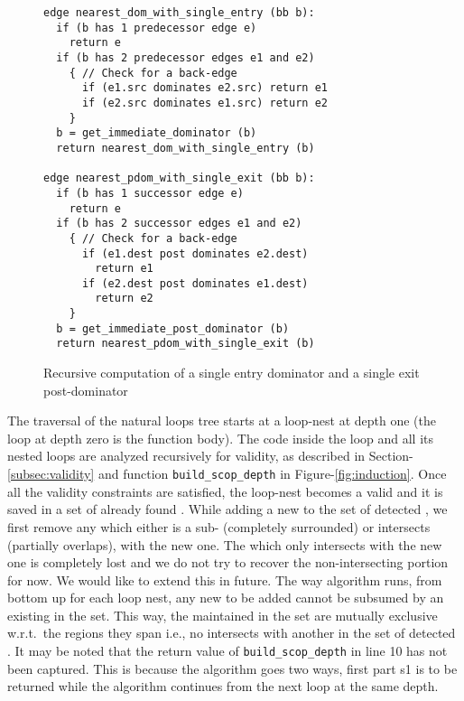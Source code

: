 \documentclass{sig-alternate}
\begin{document}
\begin{figure}
\begin{verbatim}
edge nearest_dom_with_single_entry (bb b):
  if (b has 1 predecessor edge e)
    return e
  if (b has 2 predecessor edges e1 and e2)
    { // Check for a back-edge
      if (e1.src dominates e2.src) return e1
      if (e2.src dominates e1.src) return e2
    }
  b = get_immediate_dominator (b)
  return nearest_dom_with_single_entry (b)

edge nearest_pdom_with_single_exit (bb b):
  if (b has 1 successor edge e)
    return e
  if (b has 2 successor edges e1 and e2)
    { // Check for a back-edge
      if (e1.dest post dominates e2.dest)
        return e1
      if (e2.dest post dominates e1.dest)
        return e2
    }
  b = get_immediate_post_dominator (b)
  return nearest_pdom_with_single_exit (b)
\end{verbatim}
\caption{Recursive computation of a single entry dominator and a single exit
  post-dominator}
\label{fig:iterate-single-entry}
\end{figure}

The traversal of the natural loops tree starts at a loop-nest at depth one (the
loop at depth zero is the function body).  The code inside the loop and all its
nested loops are analyzed recursively for validity, as described in
Section-\ref{subsec:validity} and function \texttt{build\_scop\_depth} in
Figure-\ref{fig:induction}.  Once all the validity constraints are satisfied,
the loop-nest becomes a valid \SCoP{} and it is saved in a set of already found
. While adding a new \SCoP{} to the set of detected , we first
remove any \SCoP{} which either is a sub-\SCoP{} (completely surrounded) or
intersects (partially overlaps), with the new one. The \SCoP{} which only
intersects with the new one is completely lost and we do not try to recover the
non-intersecting portion for now. We would like to extend this in future. The
way algorithm runs, from bottom up for each loop nest, any new \SCoP{} to be
added cannot be subsumed by an existing \SCoP{} in the set. This way, the
 maintained in the set are mutually exclusive w.r.t{.}{~}the regions they
span i.e., no \SCoP{} intersects with another in the set of detected .
It may be noted that the return value of \texttt{build\_scop\_depth} in line 10
has not been captured. This is because the algorithm goes two ways, first part
s1 is to be returned while the algorithm continues from the next loop at the
same depth.
\end{document}

